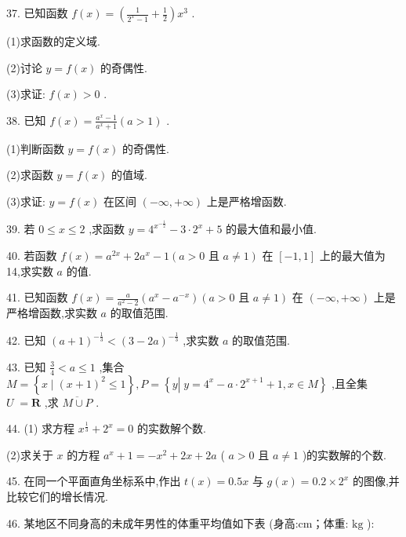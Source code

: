 \documentclass[10pt]{article}
\begin{document}
37. 已知函数 \(f\left( x\right)  = \left( {\frac{1}{{2}^{x} - 1} + \frac{1}{2}}\right) {x}^{3}\) .

(1)求函数的定义域.

(2)讨论 \(y = f\left( x\right)\) 的奇偶性.

(3)求证: \(f\left( x\right)  > 0\) .

38. 已知 \(f\left( x\right)  = \frac{{a}^{x} - 1}{{a}^{x} + 1}\left( {a > 1}\right)\) .

(1)判断函数 \(y = f\left( x\right)\) 的奇偶性.

(2)求函数 \(y = f\left( x\right)\) 的值域.

(3)求证: \(y = f\left( x\right)\) 在区间 \(\left( {-\infty , + \infty }\right)\) 上是严格增函数.

39. 若 \(0 \leq  x \leq  2\) ,求函数 \(y = {4}^{{x}^{-\frac{1}{2}}} - 3 \cdot  {2}^{x} + 5\) 的最大值和最小值.

40. 若函数 \(f\left( x\right)  = {a}^{2x} + 2{a}^{x} - 1\left( {a > 0\text{ 且 }a \neq  1}\right)\) 在 \(\left\lbrack  {-1,1}\right\rbrack\) 上的最大值为 14,求实数 \(a\) 的值.

41. 已知函数 \(f\left( x\right)  = \frac{a}{{a}^{2} - 2}\left( {{a}^{x} - {a}^{-x}}\right) \left( {a > 0\text{ 且 }a \neq  1}\right)\) 在 \(\left( {-\infty , + \infty }\right)\) 上是严格增函数,求实数 \(a\) 的取值范围.

42. 已知 \({\left( a + 1\right) }^{-\frac{1}{3}} < {\left( 3 - 2a\right) }^{-\frac{1}{3}}\) ,求实数 \(a\) 的取值范围.

43. 已知 \(\frac{3}{4} < a \leq  1\) ,集合 \(M = \left\{  {x \mid  {\left( x + 1\right) }^{2} \leq  1}\right\}  ,P = \left\{  {y\left| {\;y = {4}^{x} - a \cdot  {2}^{x + 1} + 1}\right. ,x \in  M}\right\}\) ,且全集 \(U \; = \mathbf{R}\) ,求 \(\overline{M \cup  P}\) .

44. (1) 求方程 \({x}^{\frac{1}{3}} + {2}^{x} = 0\) 的实数解个数.

(2)求关于 \(x\) 的方程 \({a}^{x} + 1 =  - {x}^{2} + {2x} + {2a}\) ( \(a > 0\) 且 \(a \neq  1\) )的实数解的个数.

45. 在同一个平面直角坐标系中,作出 \(t\left( x\right)  = {0.5x}\) 与 \(g\left( x\right)  = {0.2} \times  {2}^{x}\) 的图像,并比较它们的增长情况.

46. 某地区不同身高的未成年男性的体重平均值如下表 (身高:cm；体重: \(\mathrm{{kg}}\) ):

\begin{center}
\end{center}
\end{document}
